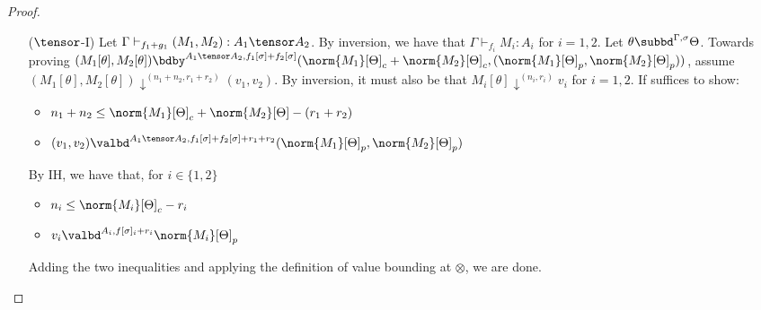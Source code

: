 \begin{proof}
\begin{itemize}
\item[($\tensor$-I)] Let $\Gamma \vdash_{f_1 + g_1} (M_1,M_2) : A_1 \tensor A_2$. By inversion, we have that $\Gamma \vdash_{f_i} M_i : A_i$ for $i = 1,2$. Let $\theta \subbd^{\Gamma,\sigma} \Theta$. Towards proving $(M_1[\theta],M_2[\theta]) \bdby^{A_1\tensor A_2,f_1[\sigma] + f_2[\sigma]} (\norm{M_1}[\Theta]_c + \norm{M_2}[\Theta]_c,(\norm{M_1}[\Theta]_p,\norm{M_2}[\Theta]_p))$, assume $(M_1[\theta], M_2[\theta]) \downarrow^{(n_1+n_2,r_1+r_2)} (v_1,v_2)$. By inversion, it must also be that $M_i[\theta] \downarrow^{(n_i,r_i)} v_i$ for $i = 1,2$.
If suffices to show:
\begin{itemize}
  \item $n_1 + n_2 \leq \norm{M_1}[\Theta]_c + \norm{M_2}[\Theta] - (r_1 + r_2)$
  \item $(v_1,v_2) \valbd^{A_1 \tensor A_2,f_1[\sigma] + f_2[\sigma] + r_1 + r_2} (\norm{M_1}[\Theta]_p,\norm{M_2}[\Theta]_p)$
\end{itemize}
By IH, we have that, for $i \in \{1,2\}$
\begin{itemize}
  \item $n_i \leq \norm{M_i}[\Theta]_c - r_i$
  \item $v_i \valbd^{A_i,f[\sigma]_i + r_i} \norm{M_i}[\Theta]_p$
\end{itemize}
Adding the two inequalities and applying the definition of value bounding at $\otimes$, we are done.


\end{itemize}
\end{proof}
